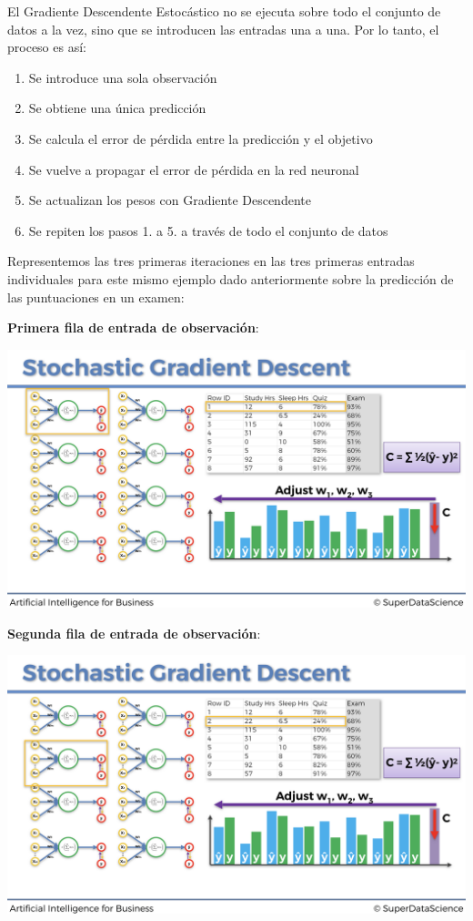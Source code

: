\documentclass[]{book}
\providecommand{\tightlist}{%
  \setlength{\itemsep}{0pt}\setlength{\parskip}{0pt}}
\begin{document}
El Gradiente Descendente Estocástico no se ejecuta sobre todo el conjunto de datos a la vez, sino que se introducen las entradas una a una. Por lo tanto, el proceso es así:

\begin{enumerate}
\def\labelenumi{\arabic{enumi}.}
\tightlist
\item
  Se introduce una sola observación
\item
  Se obtiene una única predicción
\item
  Se calcula el error de pérdida entre la predicción y el objetivo
\item
  Se vuelve a propagar el error de pérdida en la red neuronal
\item
  Se actualizan los pesos con Gradiente Descendente
\item
  Se repiten los pasos 1. a 5. a través de todo el conjunto de datos
\end{enumerate}

Representemos las tres primeras iteraciones en las tres primeras entradas individuales para este mismo ejemplo dado anteriormente sobre la predicción de las puntuaciones en un examen:

\textbf{Primera fila de entrada de observación}:

\includegraphics{Images/ANN_27.png}

\textbf{Segunda fila de entrada de observación}:

\includegraphics{Images/ANN_28.png}
\end{document}
